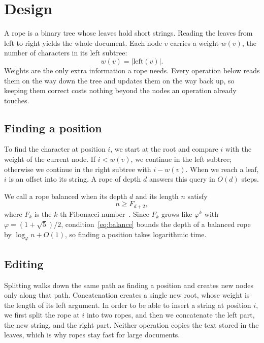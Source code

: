 \section{Design}
\label{sec:design}
A rope is a binary tree whose leaves hold short strings. Reading the leaves
from left to right yields the whole document. Each node $v$ carries a
weight $w(v)$, the number of characters in its left subtree:
\begin{equation}
  w(v) = |\mathrm{left}(v)|.
  \label{eq:weight}
\end{equation}
Weights are the only extra information a rope needs. Every operation below
reads them on the way down the tree and updates them on the way back up,
so keeping them correct costs nothing beyond the nodes an operation already
touches.

\subsection{Finding a position}
\label{sec:finding}
To find the character at position $i$, we start at the root and compare $i$
with the weight of the current node. If $i < w(v)$, we continue in the left
subtree; otherwise we continue in the right subtree with $i - w(v)$. When we
reach a leaf, $i$ is an offset into its string. A rope of depth $d$ answers
this query in $O(d)$ steps.

We call a rope balanced when its depth $d$ and its length $n$ satisfy
\begin{equation}
  n \ge F_{d+2},
  \label{eq:balance}
\end{equation}
where $F_k$ is the $k$-th Fibonacci number~\cite{boehm}. Since $F_k$ grows
like $\varphi^k$ with $\varphi = (1+\sqrt{5})/2$, condition~\eqref{eq:balance}
bounds the depth of a balanced rope by $\log_\varphi n + O(1)$, so finding a
position takes logarithmic time.

\subsection{Editing}
\label{sec:editing}
Splitting walks down the same path as finding a position and creates new
nodes only along that path. Concatenation creates a single new root, whose
weight is the length of its left argument.
In order to be able to insert a string at position $i$, we first split the rope at $i$ into two ropes, and then we concatenate the left part, the new string, and the right part.
Neither operation copies the text stored in the leaves, which is why ropes
stay fast for large documents.


